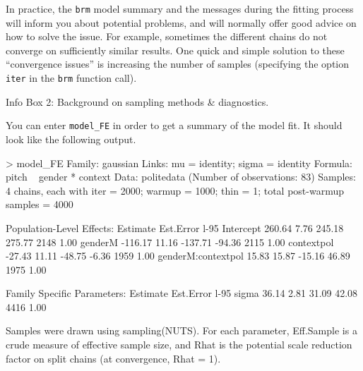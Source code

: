 \documentclass[nobib]{tufte-handout}
\begin{document}
\begin{InfoBox}[]
{\begin{minipage}{1\textwidth}
    \medskip
  
    In practice, the \texttt{brm} model summary and the messages during the fitting process will inform you about potential problems, and will normally offer good advice on how to solve the issue. 
   For example, sometimes the different chains do not converge on sufficiently similar results. 
    One quick and simple solution to these ``convergence issues'' is increasing the number of samples (specifying the option \texttt{iter} in the \texttt{brm} function call).
   
  \end{minipage} \par
  } \par
  \begin{center}
    Info Box 2: Background on sampling methods \& diagnostics.
  \end{center}
\end{InfoBox}


You can enter \texttt{model\_FE} in order to get a summary of the model fit. It should look like the following output.

\begin{minipage}[]{1.2\textwidth}
\begin{rc}
> model_FE
 Family: gaussian 
  Links: mu = identity; sigma = identity 
Formula: pitch ~ gender * context 
   Data: politedata (Number of observations: 83) 
Samples: 4 chains, each with iter = 2000; warmup = 1000; thin = 1;
         total post-warmup samples = 4000

Population-Level Effects: 
                   Estimate Est.Error l-95%
Intercept            260.64      7.76   245.18   275.77       2148 1.00
genderM             -116.17     11.16  -137.71   -94.36       2115 1.00
contextpol           -27.43     11.11   -48.75    -6.36       1959 1.00
genderM:contextpol    15.83     15.87   -15.16    46.89       1975 1.00

Family Specific Parameters: 
      Estimate Est.Error l-95%
sigma    36.14      2.81    31.09    42.08       4416 1.00

Samples were drawn using sampling(NUTS). For each parameter, Eff.Sample 
is a crude measure of effective sample size, and Rhat is the potential 
scale reduction factor on split chains (at convergence, Rhat = 1).
\end{rc}
\end{minipage}

\vspace{-0.5cm}
\end{document}
